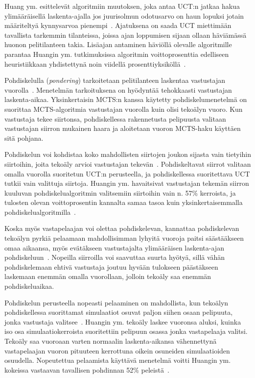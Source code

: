 \documentclass[12pt,finnish]{tktltiki2}
\theoremstyle{definition}
\theoremstyle{remark}
\begin{document}
Huang ym. esittelevät algoritmiin muutoksen, joka antaa UCT:n jatkaa hakua ylimääräisellä laskenta-ajalla jos juurisolmun odotusarvo on haun lopuksi jotain määriteltyä kynnysarvoa pienempi~\cite{huang}. Ajatuksena on saada UCT miettimään tavallista tarkemmin tilanteissa, joissa ajan loppumisen sijaan ollaan häviämässä huonon pelitilanteen takia. Lisäajan antaminen häviöllä olevalle algoritmille parantaa Huangin ym. tutkimuksissa algoritmin voittoprosenttia edelliseen heuristiikkaan yhdistettynä noin viidellä prosenttiyksiköllä~\cite{huang}.

Pohdiskelulla (\textit{pondering}) tarkoitetaan pelitilanteen laskentaa vastustajan vuorolla~\cite{huang}. Menetelmän tarkoituksena on hyödyntää tehokkaasti vastustajan laskenta-aikaa. Yksinkertaisin MCTS:n kanssa käytetty pohdiskelumenetelmä on suorittaa MCTS-algoritmia vastustajan vuorolla kuin olisi tekoälyn vuoro. Kun vastustaja tekee siirtonsa, pohdiskellessa rakennetusta pelipuusta valitaan vastustajan siirron mukainen haara ja aloitetaan vuoron MCTS-haku käyttäen sitä pohjana.

Pohdiskelun voi kohdistaa koko mahdollisten siirtojen joukon sijasta vain tietyihin siirtoihin, joita tekoäly arvioi vastustajan tekevän~\cite{huang}. Pohdiskeltavat siirrot valitaan omalla vuorolla suoritetun UCT:n perusteella, ja pohdiskellessa suoritettava UCT tutkii vain valittuja siirtoja. Huangin ym. havaitsivat vastustajan tekemän siirron kuuluvan pohdiskelualgoritmin valitsemiin siirtoihin vain n. 57\% kerroista, ja tulosten olevan voittoprosentin kannalta samaa tasoa kuin yksinkertaisemmalla pohdiskelualgoritmilla~\cite{huang}.

Koska myös vastapelaajan voi olettaa pohdiskelevan, kannattaa pohdiskelevan tekoälyn pyrkiä pelaamaan mahdollisimman lyhyitä vuoroja paitsi säästääkseen omaa aikaansa, myös evätäkseen vastustajalta ylimääräisen laskenta-ajan pohdiskeluun~\cite{huang}. Nopeilla siirroilla voi saavuttaa suurta hyötyä, sillä vähän pohdiskelemaan ehtivä vastustaja joutuu hyvään tulokseen päästäkseen laskemaan enemmän omalla vuorollaan, jolloin tekoäly saa enemmän pohdiskeluaikaa. 

Pohdiskelun perusteella nopeasti pelaaminen on mahdollista, kun tekoälyn pohdiskellessa suorittamat simulaatiot osuvat paljon siihen osaan pelipuuta, jonka vastustaja valitsee~\cite{huang}. Huangin ym. tekoäly laskee vuoronsa aluksi, kuinka iso osa simulaatiokerroista suoritettiin pelipuun osassa jonka vastapelaaja valitsi. Tekoäly saa vuoroaan varten normaalin laskenta-aikansa vähennettynä vastapelaajan vuoron pituuteen kerrottuna oikein osuneiden simulaatioiden osuudella. Nopeutettua pelaamista käyttävä menetelmä voitti Huangin ym. kokeissa vastaavan tavallisen pohdinnan 52\% peleistä~\cite{huang}.
\end{document}
